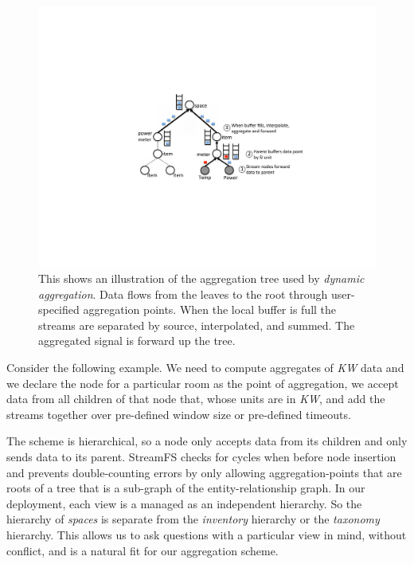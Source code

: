 \begin{figure}[htb!]
\begin{center}
\includegraphics[scale=0.6]{figs/aggtree}
\caption{This shows an illustration of the aggregation tree used by \emph{dynamic aggregation}.  Data flows from 
the leaves to the root through user-specified aggregation points.  When the local buffer is full the streams
are separated by source, interpolated, and summed.  The aggregated signal is forward up the tree.}
\label{fig:aggtree}
\end{center}
\end{figure}

Consider the following example.  We need to compute aggregates of \emph{KW} data and we declare the node for a particular room as
the point of aggregation, we accept data from all children of that node that, whose units are in \emph{KW},
and add the streams together over pre-defined window size or pre-defined timeouts.

The scheme is hierarchical, so a node only accepts data from its children and only sends data to its parent.
StreamFS checks for cycles when before node insertion and prevents double-counting errors by only allowing 
aggregation-points that are roots of a tree that is a sub-graph of the entity-relationship graph.  In our deployment,
each view is a managed as an independent hierarchy.  So the hierarchy of \emph{spaces} is separate from
the \emph{inventory} hierarchy or the \emph{taxonomy} hierarchy.  This allows us to ask questions with a particular
view in mind, without conflict, and is a natural fit for our aggregation scheme.

